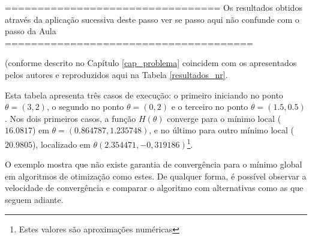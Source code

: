 \documentclass{abnt}
\begin{document}
	=================================	Os resultados obtidos através da aplicação sucessiva deste passo ver se passo aqui não confunde com o passo da Aula ======================================
	
	(conforme descrito no Capítulo \ref{cap_problema} coincidem com os apresentados pelos autores e reproduzidos aqui na Tabela \ref{resultados_nr}.

Esta tabela apresenta três casos de execução: o primeiro iniciando no ponto $\theta=(3,2)$, o segundo no ponto $\theta=(0,2)$ e o terceiro no ponto $\theta=(1.5, 0.5)$. Nos dois primeiros casos, a função $H(\theta)$ converge para o mínimo local ($16.0817$) em $\theta=(0.864787,1.235748)$, e no último para outro mínimo local ($20.9805$), localizado em $\theta(2.354471,-0,319186)$\footnote{Estes valores são aproximações numéricas}.

O exemplo mostra que não existe garantia de convergência para o mínimo global em algoritmos de otimização como estes. De qualquer forma, é possível observar a velocidade de convergência e comparar o algoritmo com alternativas como as que seguem adiante.
\end{document}
